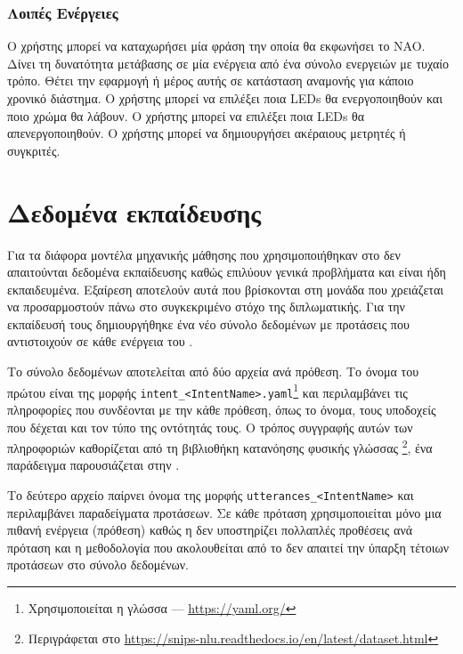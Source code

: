 \subsubsection{Λοιπές Ενέργειες}
\begin{compactitem}
     Ο χρήστης μπορεί να καταχωρήσει μία φράση την οποία θα εκφωνήσει το NAO.
     Δίνει τη δυνατότητα μετάβασης σε μία ενέργεια από ένα σύνολο ενεργειών με τυχαίο τρόπο.
     Θέτει την εφαρμογή ή μέρος αυτής σε κατάσταση αναμονής για κάποιο χρονικό διάστημα.
     Ο χρήστης μπορεί να επιλέξει ποια LEDs θα ενεργοποιηθούν και ποιο χρώμα θα λάβουν.
     Ο χρήστης μπορεί να επιλέξει ποια LEDs θα απενεργοποιηθούν.
     Ο χρήστης μπορεί να δημιουργήσει ακέραιους μετρητές ή συγκριτές.
\end{compactitem}

\section{Δεδομένα εκπαίδευσης}
Για τα διάφορα μοντέλα μηχανικής μάθησης που χρησιμοποιήθηκαν στο \projectname{} δεν απαιτούνται δεδομένα εκπαίδευσης καθώς επιλύουν γενικά προβλήματα και είναι ήδη εκπαιδευμένα.
Εξαίρεση αποτελούν αυτά που βρίσκονται στη μονάδα \NLU{} που χρειάζεται να προσαρμοστούν πάνω στο συγκεκριμένο στόχο της διπλωματικής.
Για την εκπαίδευσή τους δημιουργήθηκε ένα νέο σύνολο δεδομένων με προτάσεις που αντιστοιχούν σε κάθε ενέργεια του \metamodel{}.

Το σύνολο δεδομένων αποτελείται από δύο αρχεία ανά πρόθεση.
Το όνομα του πρώτου είναι της μορφής \texttt{intent_<IntentName>.yaml}\footnote{Χρησιμοποιείται η γλώσσα  --- \url{https://yaml.org/}}
και περιλαμβάνει τις πληροφορίες που συνδέονται με την κάθε πρόθεση, όπως το όνομα, τους υποδοχείς που δέχεται και τον τύπο της οντότητάς τους.
Ο τρόπος συγγραφής αυτών των πληροφοριών καθορίζεται από τη βιβλιοθήκη κατανόησης φυσικής γλώσσας \footnote{Περιγράφεται στο \url{https://snips-nlu.readthedocs.io/en/latest/dataset.html}},
ένα παράδειγμα παρουσιάζεται στην .

Το δεύτερο αρχείο παίρνει όνομα της μορφής \texttt{utterances_<IntentName>} και περιλαμβάνει παραδείγματα προτάσεων.
Σε κάθε πρόταση χρησιμοποιείται μόνο μια πιθανή ενέργεια (πρόθεση) καθώς η  δεν υποστηρίζει πολλαπλές προθέσεις ανά πρόταση και η μεθοδολογία που ακολουθείται από το \projectname{} δεν απαιτεί την ύπαρξη τέτοιων προτάσεων στο σύνολο δεδομένων.

